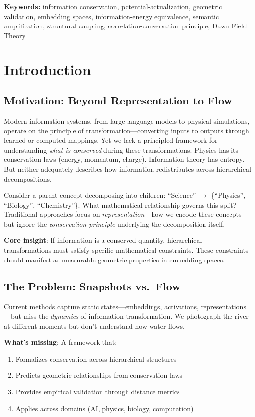 \documentclass[11pt,a4paper]{article}
\begin{document}
\textbf{Keywords:} information conservation, potential-actualization, geometric validation, embedding spaces, information-energy equivalence, semantic amplification, structural coupling, correlation-conservation principle, Dawn Field Theory

\section{Introduction}

\subsection{Motivation: Beyond Representation to Flow}

Modern information systems, from large language models to physical simulations, operate on the principle of transformation---converting inputs to outputs through learned or computed mappings. Yet we lack a principled framework for understanding \emph{what is conserved} during these transformations. Physics has its conservation laws (energy, momentum, charge). Information theory has entropy. But neither adequately describes how information redistributes across hierarchical decompositions.

Consider a parent concept decomposing into children: ``Science'' $\to$ \{``Physics'', ``Biology'', ``Chemistry''\}. What mathematical relationship governs this split? Traditional approaches focus on \emph{representation}---how we encode these concepts---but ignore the \emph{conservation principle} underlying the decomposition itself.

\textbf{Core insight}: If information is a conserved quantity, hierarchical transformations must satisfy specific mathematical constraints. These constraints should manifest as measurable geometric properties in embedding spaces.

\subsection{The Problem: Snapshots vs.\ Flow}

Current methods capture static states---embeddings, activations, representations---but miss the \emph{dynamics} of information transformation. We photograph the river at different moments but don't understand how water flows.

\textbf{What's missing}: A framework that:
\begin{enumerate}
    \item Formalizes conservation across hierarchical structures
    \item Predicts geometric relationships from conservation laws
    \item Provides empirical validation through distance metrics
    \item Applies across domains (AI, physics, biology, computation)
\end{enumerate}
\end{document}
